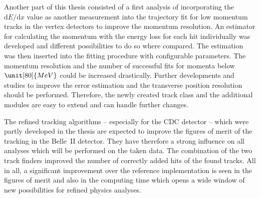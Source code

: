 Another part of this thesis consisted of a first analysis of incorporating the $\mathrm dE/\mathrm d x$ value as another measurement into the trajectory fit for low momentum tracks in the vertex detectors to improve the momentum resolution. An estimator for calculating the momentum with the energy loss for each hit individually was developed and different possibilities to do so where compared. The estimation was then inserted into the fitting procedure with configurable parameters. The momentum resolution and the number of successful fits for momenta below $\unit[80]{MeV}$ could be increased drastically. Further developments and studies to improve the error estimation and the transverse position resolution should be performed. Therefore, the newly created track class and the additional modules are easy to extend and can handle further changes.


The refined tracking algorithms -- especially for the CDC detector -- which were partly developed in the thesis are expected to improve the figures of merit of the tracking in the Belle~II detector. They have therefore a strong influence on all analyses which will be performed on the taken data. The combination of the two track finders improved the number of correctly added hits of the found tracks. All in all, a significant improvement over the reference implementation is seen in the figures of merit and also in the computing time which opens a wide window of new possibilities for refined physics analyses.